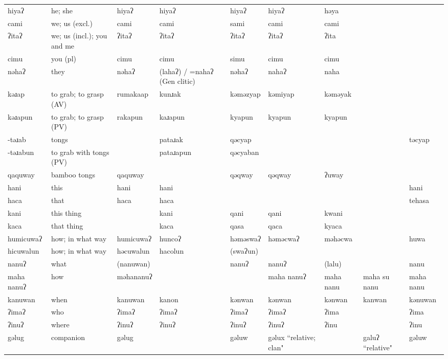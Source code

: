 \begin{landscape}
\begin{longtable}{*{9}{p{}}}
\text{*}hiyaʔ & he; she & hiyaʔ & hiyaʔ & hiyaʔ & hiyaʔ & həya &  & \\
\text{*}cami & we; us (excl.) & cami & cami & sami & cami & cami &  & \\
\text{*}ʔitaʔ & we; us (incl.); you and me & ʔitaʔ & ʔitaʔ & ʔitaʔ & ʔitaʔ & ʔita &  & \\
\text{*}cimu & you (pl) & cimu & cimu & simu & cimu & cimu &  & \\
\text{*}nəhaʔ & they & nəhaʔ & (lahaʔ) / =nahaʔ (Gen clitic) & nəhaʔ & nahaʔ & naha &  & \\
\text{*}kəɹap & to grab; to grasp (AV) & rumakaap & kunɹak & kəməzyap & kəmiyap & kəməyak &  & \\
\text{*}kəɹapun & to grab; to grasp (PV) & rakapun & kaɹapun & kyapun & kyapun & kyapun &  & \\
\text{*}-təɹab & tongs &  & pataɹak & qəcyap &  &  &  & təcyap\\
\text{*}-təɹabun & to grab with tongs (PV) &  & pataɹapun & qəcyaban &  &  &  & \\
\text{*}qaquway & bamboo tongs & qaquway &  & qəqway & qəqway & ʔuway &  & \\
\text{*}hani & this & hani & hani &  &  &  &  & hani\\
\text{*}haca & that & haca & haca &  &  &  &  & tehasa\\
\text{*}kani & this thing &  & kani & qani & qani & kwani &  & \\
\text{*}kaca & that thing &  & kaca & qasa & qaca & kyaca &  & \\
\text{*}humicuwaʔ & how; in what way & humicuwaʔ & huncoʔ & həməswaʔ & həməcwaʔ & məhəcwa &  & huwa\\
\text{*}hicuwalun & how; in what way & həcuwalun & hacolun & (swaʔun) &  &  &  & \\
\text{*}nanuʔ & what & (nanuwan) &  & nanuʔ & nanuʔ & (lalu) &  & nanu\\
\text{*}maha nanuʔ & how & məhananuʔ &  &  & maha nanuʔ & maha nanu & maha su nanu & maha nanu\\
\text{*}kanuwan & when & kanuwan & kanon & kənwan & kənwan & kənwan & kanwan & kənuwan\\
\text{*}ʔimaʔ & who & ʔimaʔ & ʔimaʔ & ʔimaʔ & ʔimaʔ & ʔima &  & ʔima\\
\text{*}ʔinuʔ & where & ʔinuʔ & ʔinuʔ & ʔinuʔ & ʔinuʔ & ʔinu &  & ʔinu\\
\text{*}gəlug & companion & gəlug &  & gəluw & gəlux ``relative; clan" &  & galuʔ ``relative" & gəluw\\

\end{longtable}
\end{landscape}
